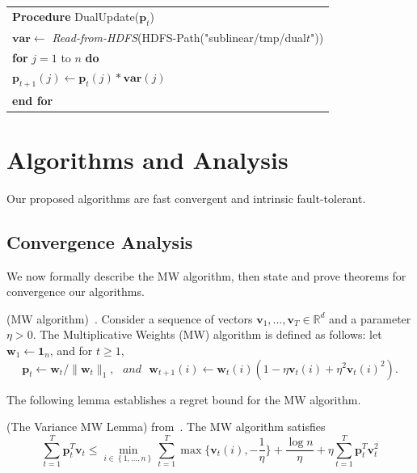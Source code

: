 \documentclass{llncs}
\newcommand{\bw}{\mathbf{w}}
\newcommand{\bp}{\mathbf{p}}
\newcommand{\sumt}{\sum_{t=1}^{T} }
\newcommand{\lc}{\left(}
\newcommand{\rc}{\right)}
\newcommand{\tspace}{\hspace*{2em}}
\begin{document}
    \begin{table}[ht]
	\begin{tabular}{l}
	\hline\noalign{\smallskip}
	\textbf{Procedure} DualUpdate($\bp_t$) \\
	\noalign{\smallskip}
	\hline
	\noalign{\smallskip}
        $\mathbf{var} \leftarrow$ \textit{Read-from-HDFS}(HDFS-Path("sublinear/tmp/dual$t$")) \\
        \textbf{for} $j=1$ to $n$ \textbf{do} \\
        \tspace $\bp_{t+1}(j) \leftarrow \bp_t(j)*\mathbf{var}(j)$ \\
        \textbf{end for} \\
	\hline
	\end{tabular}
	\end{table}
	
\section{Algorithms and Analysis} \label{sec:alg}

Our proposed algorithms are fast convergent and intrinsic fault-tolerant.
	
\subsection{Convergence Analysis}
	We now formally describe the MW algorithm, then state and prove theorems for convergence our algorithms.

	\begin{definition}
	(MW algorithm)~\cite{clarkson2010sublinear}. Consider a sequence of vectors $\mathbf{v}_1,...,\mathbf{v}_T\in\mathbb{R}^d$ and a parameter $\eta>0$. The Multiplicative Weights (MW) algorithm is defined as follows: let $\bw_1 \leftarrow \mathbf{1}_n$, and for $t\geq 1$,
	\[
	\bp_t \leftarrow \bw_t/\|\bw_t\|_1, \,\,\,\, and \,\,\,\, \bw_{t+1}(i) \leftarrow \bw_t(i)\lc 1-\eta\mathbf{v}_t(i)+\eta^2\mathbf{v}_t(i)^2 \rc.
	\]
	\end{definition}
	
	The following lemma establishes a regret bound for the MW algorithm.
	
	\begin{lemma} \label{lem:2}
	(The Variance MW Lemma) from~\cite{clarkson2010sublinear}. The MW algorithm satisfies
	\[
	\sumt \bp_t^T\mathbf{v}_t \leq \min_{i\in\left\{1,...,n\right\} } \sumt \max\{\mathbf{v}_t(i),-\frac{1}{\eta}\}+\frac{\log n}{\eta}+\eta\sumt\bp_t^T \mathbf{v}_t^2
	\]
	\end{lemma}
	
\end{document}
